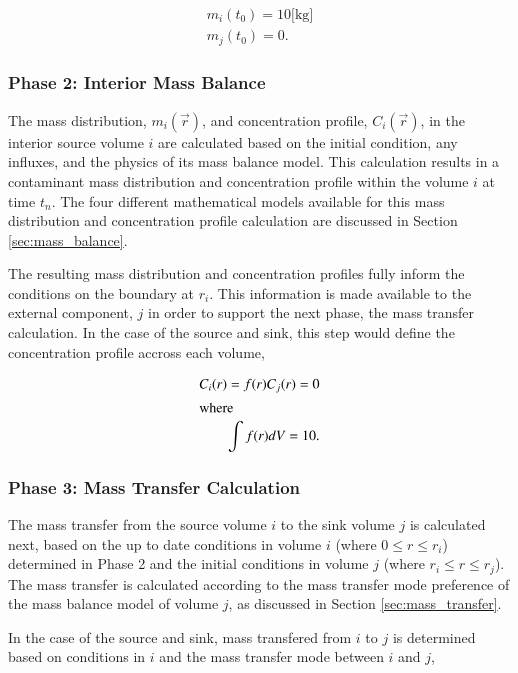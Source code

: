 \begin{align}
 m_i(t_0) = 10 \mbox{[kg]}\\
 m_j(t_0) = 0.
\end{align}

\subsubsection{Phase 2: Interior Mass Balance}

The mass distribution, $m_i(\vec{r})$, and concentration profile, $C_i(\vec{r})$, in the interior source volume 
$i$ are calculated based on the initial condition, any influxes, and the physics of 
its mass balance model.  This calculation results in a contaminant mass 
distribution and concentration profile within the volume $i$ at time $t_n$.  
The four different mathematical models available for this mass distribution and 
concentration profile calculation are discussed in Section \ref{sec:mass_balance}.

The resulting mass distribution and concentration profiles fully inform
the conditions on the boundary at $r_i$. This information is made available 
to the external component, $j$ in order to support the next phase, the mass 
transfer calculation. In the case of the source and sink, this step would 
define the concentration profile accross each volume,

\begin{align}
C_i(r) = f(r) 
C_j(r) = 0\\
\intertext{where}
\int f(r)dV = 10.
\end{align}

\subsubsection{Phase 3: Mass Transfer Calculation}

The mass transfer from the source volume $i$ to the sink volume $j$ is 
calculated next, based on the up to date conditions in volume $i$ (where $0\le r \le r_i$) 
determined in Phase 2 and the initial conditions in volume $j$ (where $r_i \le 
r \le r_j$). The mass transfer is calculated according to the mass transfer mode 
preference of the mass balance model of volume $j$, as discussed in Section 
\ref{sec:mass_transfer}. 

In the case of the source and sink, mass transfered from $i$ to $j$ is 
determined based on conditions in $i$ and the mass transfer mode between $i$ 
and $j$,

